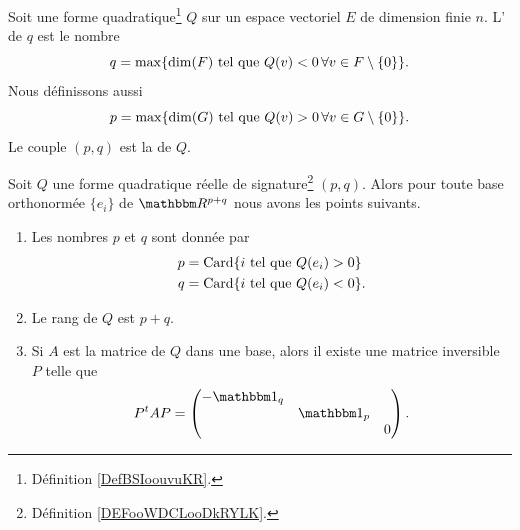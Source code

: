 \begin{definition}       \label{DEFooWDCLooDkRYLK}
    Soit une forme quadratique\footnote{Définition \ref{DefBSIoouvuKR}.} \( Q\) sur un espace vectoriel \( E\) de dimension finie \( n\). L' de \( q\) est le nombre
    \begin{equation}
        q=\max\{ \dim(F)\text{ tel que } Q(v)<0\,\forall v\in F\setminus\{ 0 \} \}.
    \end{equation}
    Nous définissons aussi
    \begin{equation}
        p=\max\{ \dim(G)\text{ tel que } Q(v)>0\,\forall v\in G\setminus\{ 0 \} \}.
    \end{equation}
    Le couple \( (p,q)\) est la  de \( Q\).
\end{definition}

\begin{theorem}   \label{ThoQFVsBCk}
    Soit $Q$ une forme quadratique réelle de signature\footnote{Définition \ref{DEFooWDCLooDkRYLK}.} \( (p,q)\). Alors pour toute base orthonormée \( \{ e_i \}\) de \( \eR^{p+q}\) nous avons les points suivants.
    \begin{enumerate}
        \item
            Les nombres \( p\) et \( q\) sont donnée par 
    \begin{subequations}
        \begin{align}
            p&=\operatorname{Card}\{ i\text{ tel que } Q(e_i)>0 \}\\
            q&=\operatorname{Card}\{ i\text{ tel que } Q(e_i)<0 \}.
        \end{align}
    \end{subequations}
\item
    Le rang de \( Q\) est \( p+q\).
\item
    Si \( A\) est la matrice de \( Q\) dans une base, alors il existe une matrice inversible \( P\) telle que
    \begin{equation}
        P^tAP=\begin{pmatrix}
            -\mtu_q    &       &       \\
                &   \mtu_p    &       \\
                &       &   0
        \end{pmatrix}.
    \end{equation}
    \end{enumerate}
\end{theorem}

